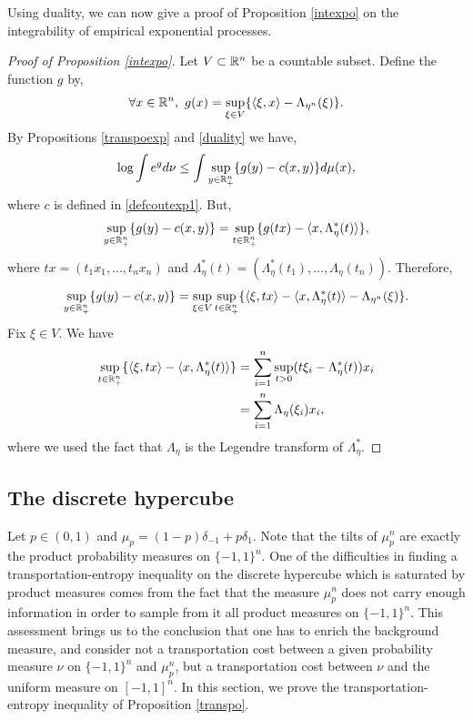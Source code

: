 \documentclass[a4paper,oneside,11pt]{article}
\begin{document}
Using duality, we can now give a proof of Proposition \ref{intexpo} on the integrability of empirical exponential processes. 

\begin{proof}[Proof of Proposition \ref{intexpo}]Let $V \subset \mathbb{R}^n$ be a countable subset. Define the function $g$ by,
$$\forall x \in \mathbb{R}^n, \  g(x) = \sup_{\xi \in V } \{ \langle \xi, x\rangle -\Lambda_{\eta^n}(\xi)\}.$$
By Propositions \ref{transpoexp} and \ref{duality} we have,
$$ \log \int e^{g}d\nu \leq \int \sup_{y \in \mathbb{R}_+^n} \{ g(y) - c(x,y) \}d\mu(x),$$
where $c$ is defined in \eqref{defcoutexp1}.
But,
$$ \sup_{y\in \mathbb{R}_+^n} \{ g(y) - c(x,y) \} = \sup_{t \in \mathbb{R}_+^n} \{ g(tx)-\langle   x, \Lambda^*_\eta(t)\rangle \},$$
where $tx = (t_1 x_1,\ldots ,t_nx_n)$ and $\Lambda_\eta^*(t) = (\Lambda^*_\eta(t_1),\ldots,\Lambda_\eta(t_n))$.
Therefore,
$$ \sup_{y\in \mathbb{R}_+^n} \{ g(y) -c(x,y) \} = \sup_{\xi \in V} \sup_{t \in \mathbb{R}_+^n} \{ \langle \xi, tx\rangle-\langle x,\Lambda^*_{\eta}(t)\rangle -\Lambda_{\eta^n}(\xi) \}.$$
Fix $\xi \in V$. We have
\begin{align*} \sup_{t \in \mathbb{R}_+^n} \{ \langle \xi, tx\rangle-\langle x, \Lambda^*_\eta(t)\rangle \}& = \sum_{i=1}^n \sup_{t>0} (t \xi_i-\Lambda^*_\eta(t)) x_i \\
& = \sum_{i=1}^n  \Lambda_{\eta}(\xi_i) x_i,
\end{align*}
where we used the fact that $\Lambda_{\eta}$ is the Legendre transform of $\Lambda^*_{\eta}$.
\end{proof}


\subsection{The discrete hypercube}
Let $p\in(0,1)$ and $\mu_p= (1-p) \delta_{-1} + p \delta_{1}$. Note that the tilts of $\mu_p^n$ are exactly the product probability measures on  $\{-1,1\}^n$. One of the difficulties in finding a transportation-entropy inequality on the discrete hypercube which is saturated by product measures comes from the fact that the measure $\mu_p^n$ does not carry enough information in order to sample from it all product measures on $\{-1,1\}^n$. This assessment brings us to the conclusion that one has to enrich the background measure, and consider not a transportation cost between a given probability measure $\nu$ on $\{-1,1\}^n$ and $\mu_p^n$, but a transportation cost between $\nu$ and the uniform measure on $[-1,1]^n$. In this section, we prove the transportation-entropy inequality of Proposition \ref{transpo}.
\end{document}
